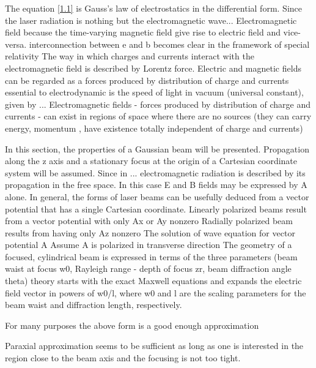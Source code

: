 The equation \ref{1.1} is Gauss's law of electrostatics in the differential form. 
Since the laser radiation is nothing but the electromagnetic wave...
Electromagnetic field because the time-varying magnetic field give rise to electric field and vice-versa. interconnection between e and b becomes clear in the framework of special relativity
The way in which charges and currents interact with the electromagnetic field is described by Lorentz force.
Electric and magnetic fields can be regarded as a forces produced by distribution of charge and currents
essential to electrodynamic is the speed of light in vacuum (universal constant), given by ...
Electromagnetic fields - forces produced by distribution of charge and currents - can exist in regions of space where there are no sources (they can carry energy, momentum , have existence totally independent of charge and currents) 

In this section, the properties of a Gaussian beam will be presented.
Propagation along the z axis and a stationary
focus at the origin of a Cartesian coordinate system will be
assumed.
Since in ... electromagnetic radiation is described by its propagation in the free space.
In this case E and B fields may be expressed by A alone. 
In general, the forms of laser beams can be usefully deduced from a vector potential that
has a single Cartesian coordinate.
Linearly polarized beams result from a vector potential with only Ax or Ay nonzero
Radially polarized beam results from having only Az nonzero
The solution of wave equation for vector potential A
Assume A is polarized in transverse direction 
The geometry of a focused, cylindrical beam is expressed in terms
of the three parameters (beam waist at focus w0, Rayleigh range - depth of focus zr, beam diffraction angle theta)
theory starts with the exact Maxwell equations and expands the electric field vector in powers of w0/l, where w0 and l are the scaling parameters for the beam waist and diffraction length, respectively.

For many purposes the above form is a good enough approximation

Paraxial approximation seems to be sufficient as long as one is interested in the region close to the beam axis and the focusing is not too tight.
